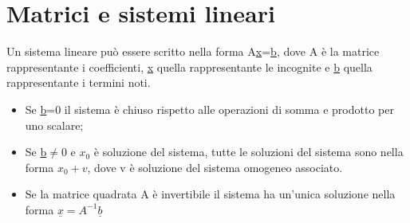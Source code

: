 \section{Matrici e sistemi lineari}
Un sistema lineare pu\`o essere scritto nella forma A\underline{x}=\underline{b}, dove A \`e la matrice rappresentante i coefficienti, \underline{x} quella rappresentante le
incognite e \underline{b} quella rappresentante i termini noti.
\begin{itemize}
\item  Se \underline{b}=0 il sistema \`e chiuso rispetto alle operazioni di somma e prodotto per uno scalare;
\item Se \underline{b}$\neq 0$ e $x_0$ \`e soluzione del sistema, tutte le soluzioni del sistema sono nella forma $x_0+v$, dove v \`e soluzione del sistema omogeneo associato.
\item Se la matrice quadrata A \`e invertibile il sistema ha un'unica soluzione nella forma $\underline{x}=A^{-1}\underline{b}$
\end{itemize}